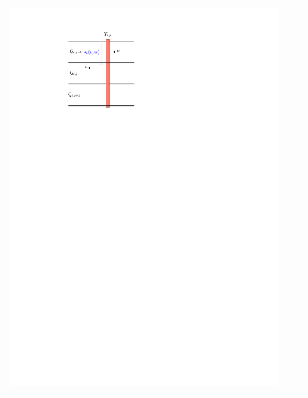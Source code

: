 \documentclass{patmorin}
\begin{document}
\begin{figure}
\begin{tabular}{ccc}
    \includegraphics[page=2,scale=0.85]{figs/new_metric} &

\end{tabular}
\end{figure}
\end{document}
